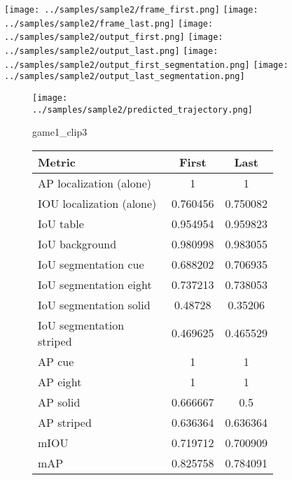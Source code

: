 \begin{figure}
    \texttt{[image: ../samples/sample2/frame\_first.png]}
    \texttt{[image: ../samples/sample2/frame\_last.png]}
    \newline
    \texttt{[image: ../samples/sample2/output\_first.png]}
    \texttt{[image: ../samples/sample2/output\_last.png]}
    \newline
    \texttt{[image: ../samples/sample2/output\_first\_segmentation.png]}
    \texttt{[image: ../samples/sample2/output\_last\_segmentation.png]}
    \newline
    \begin{subfigure}[b]{0.49\textwidth}
        \vspace{20pt}
        \texttt{[image: ../samples/sample2/predicted\_trajectory.png]}
        \caption*{game1\_clip3}
    \end{subfigure}
\begin{subfigure}[b]{0.49\textwidth}
    \begin{tabular}{|l|c|c|}
        \hline
        \textbf{Metric} & \textbf{First} & \textbf{Last} \\
        \hline
        AP localization (alone) & 1 & 1 \\ 
        IOU localization (alone) & 0.760456 & 0.750082 \\ 
        \hline
        IoU table & 0.954954 & 0.959823 \\ 
        IoU background & 0.980998 & 0.983055 \\ 
        \hline
        IoU segmentation cue & 0.688202 & 0.706935 \\ 
        IoU segmentation eight & 0.737213 & 0.738053 \\ 
        IoU segmentation solid & 0.48728 & 0.35206 \\ 
        IoU segmentation striped & 0.469625 & 0.465529 \\ 
        \hline
        AP cue & 1 & 1 \\ 
        AP eight & 1 & 1 \\ 
        AP solid & 0.666667 & 0.5 \\ 
        AP striped & 0.636364 & 0.636364 \\ 
        \hline
        mIOU & 0.719712 & 0.700909 \\ 
        mAP & 0.825758 & 0.784091 \\ 
        \hline
    \end{tabular}    
\end{subfigure}
\end{figure}

